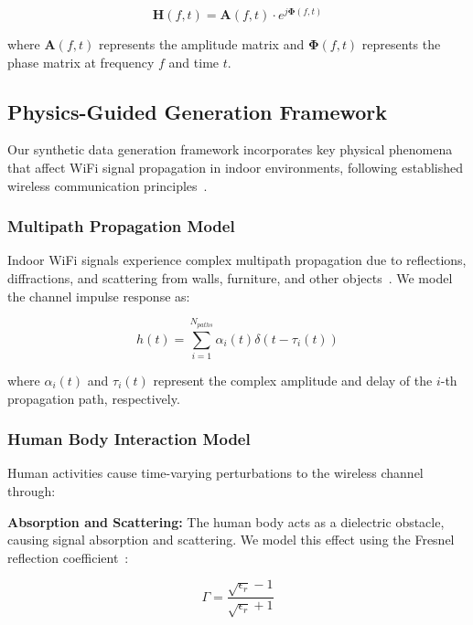\documentclass[journal]{IEEEtran}
\begin{document}
\begin{equation}
\mathbf{H}(f,t) = \mathbf{A}(f,t) \cdot e^{j\boldsymbol{\Phi}(f,t)}
\end{equation}

where $\mathbf{A}(f,t)$ represents the amplitude matrix and $\boldsymbol{\Phi}(f,t)$ represents the phase matrix at frequency $f$ and time $t$.

\subsection{Physics-Guided Generation Framework}

Our synthetic data generation framework incorporates key physical phenomena that affect WiFi signal propagation in indoor environments, following established wireless communication principles~\cite{goldsmith2005wireless}.

\subsubsection{Multipath Propagation Model}

Indoor WiFi signals experience complex multipath propagation due to reflections, diffractions, and scattering from walls, furniture, and other objects~\cite{multipath_fading2003}. We model the channel impulse response as:

\begin{equation}
h(t) = \sum_{i=1}^{N_{paths}} \alpha_i(t) \delta(t - \tau_i(t))
\end{equation}

where $\alpha_i(t)$ and $\tau_i(t)$ represent the complex amplitude and delay of the $i$-th propagation path, respectively.

\subsubsection{Human Body Interaction Model}

Human activities cause time-varying perturbations to the wireless channel through:

\textbf{Absorption and Scattering:} The human body acts as a dielectric obstacle, causing signal absorption and scattering. We model this effect using the Fresnel reflection coefficient~\cite{fresnel_reflection1995}:

\begin{equation}
\Gamma = \frac{\sqrt{\epsilon_r} - 1}{\sqrt{\epsilon_r} + 1}
\end{equation}
\end{document}
